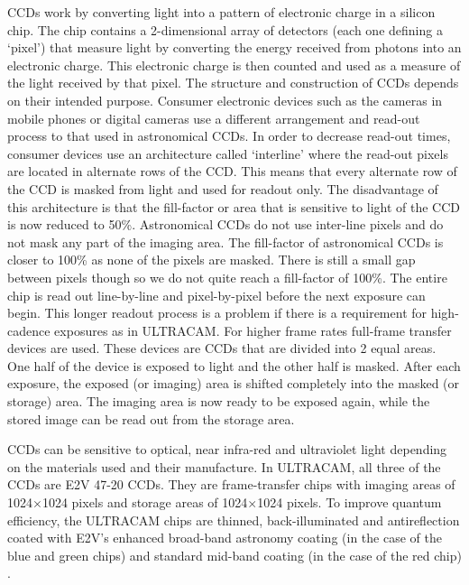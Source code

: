 CCDs work by converting light into a pattern of electronic charge in a silicon chip. The chip contains a 2-dimensional array of detectors (each one defining a `pixel') that measure light by converting the energy received from photons into an electronic charge. This electronic charge is then counted and used as a measure of the light received by that pixel. The structure and construction of CCDs depends on their intended purpose. Consumer electronic devices such as the cameras in mobile phones or digital cameras use a different arrangement and read-out process to that used in astronomical CCDs. In order to decrease read-out times, consumer devices use an architecture called `interline' where the read-out pixels are located in alternate rows of the CCD. This means that every alternate row of the CCD is masked from light and used for readout only. The disadvantage of this architecture is that the fill-factor or area that is sensitive to light of the CCD is now reduced to 50\%. Astronomical CCDs do not use inter-line pixels and do not mask any part of the imaging area.  The fill-factor of astronomical CCDs is closer to 100\% as none of the pixels are masked. There is still a small gap between pixels though so we do not quite reach a fill-factor of 100\%. The entire chip is read out line-by-line and pixel-by-pixel before the next exposure can begin. This longer readout process is a problem if there is a requirement for high-cadence exposures as in ULTRACAM. For higher frame rates full-frame transfer devices are used. These devices are CCDs that are divided into 2 equal areas. One half of the device is exposed to light and the other half is masked. After each exposure, the exposed (or imaging) area is shifted completely into the masked (or storage) area. The imaging area is now ready to be exposed again, while the stored image can be read out from the storage area.  

CCDs can be sensitive to optical, near infra-red and ultraviolet light depending on the materials used and their manufacture. In ULTRACAM, all three of the CCDs are E2V 47-20 CCDs. They are frame-transfer chips with imaging areas of 1024$\times$1024 pixels and storage areas of 1024$\times$1024 pixels.  To improve quantum efficiency, the ULTRACAM chips are thinned, back-illuminated and antireflection coated with E2V's enhanced broad-band astronomy coating (in the case of the blue and green chips) and standard mid-band coating (in the case of the red chip) \citep{dhillon07}.

